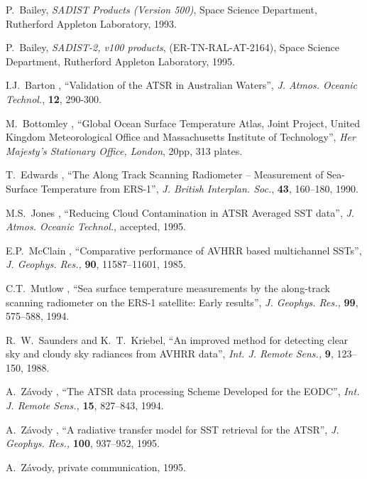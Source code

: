 {\footnotesize
\begin{thebibliography}{99}

 P.~Bailey,  {\sl SADIST Products (Version 500)},
Space Science Department, Rutherford Appleton Laboratory, 1993. 

  P.~Bailey, {\sl SADIST-2, v100 products},  
(ER-TN-RAL-AT-2164), 
Space Science Department, Rutherford Appleton Laboratory, 1995.

 I.J.~Barton \etal, ``Validation of the ATSR in 
Australian Waters'', 
{\sl J. Atmos. Oceanic Technol.}, {\bf 12}, 290-300.

 M.~Bottomley \etal, ``Global Ocean Surface 
Temperature Atlas, Joint Project, United Kingdom Meteorological Office and 
Massachusetts Institute of Technology'', 
{\sl Her Majesty's Stationary Office, London}, 20pp, 313 plates.

 T.~Edwards \etal, ``The Along Track Scanning Radiometer
-- Measurement of Sea-Surface Temperature from ERS-1'',
{\sl J. British Interplan. Soc.}, {\bf 43}, 160--180,
1990.

 M.S.~Jones \etal, ``Reducing Cloud Contamination
in ATSR Averaged SST data'', 
{\sl J. Atmos. Oceanic Technol.}, accepted, 1995.

 E.P.~McClain \etal, ``Comparative performance of AVHRR 
based multichannel SSTs'', 
{\sl J. Geophys. Res.,} {\bf 90}, 11587--11601, 1985. 

 C.T.~Mutlow \etal, ``Sea surface temperature measurements
by the along-track scanning radiometer on the ERS-1 satellite: Early
results'', {\sl J. Geophys. Res.,} {\bf 99}, 575--588, 1994. 

 R.~W.~Saunders and K.~T.~Kriebel,
``An improved method for detecting clear sky and cloudy sky radiances
from AVHRR data'', 
{\sl Int. J. Remote Sens.,} {\bf 9}, 123--150, 1988.

 A.~Z\'{a}vody \etal, 
``The  ATSR data processing Scheme Developed for the  EODC'', 
{\sl Int. J. Remote Sens.,} {\bf 15}, 827--843, 1994.

 A.~Z\'{a}vody \etal, 
``A radiative transfer model for SST retrieval for the ATSR'',
{\sl J. Geophys. Res.,} {\bf 100}, 937--952, 1995.

 A.~Z\'{a}vody, private communication, 1995.

\end{thebibliography} }

